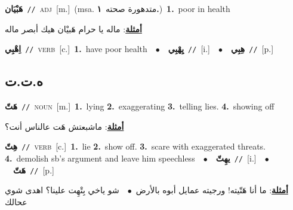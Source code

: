 \documentclass[10pt,a4paper,twoside]{article} %
\begin{document}
\begin{multicols}{2}
{{{{{{{{{{\setlength\topsep{0pt}\textbf{\foreignlanguage{arabic}{هَبْيَان}}\ {\color{gray}\texttt{//}\color{black}}\ \textsc{adj}\ [m.]\ \color{gray}(msa. \foreignlanguage{arabic}{متدهورة صحته}~\foreignlanguage{arabic}{\textbf{١.}})\color{black}\ \textbf{1.}~poor in health\  \begin{flushright}\color{gray}\foreignlanguage{arabic}{\textbf{\underline{\foreignlanguage{arabic}{أمثلة}}}: ماله يا حرام هَبيْان هيك أبصر ماله}\end{flushright}\color{black}} \vspace{2mm}

{\setlength\topsep{0pt}\textbf{\foreignlanguage{arabic}{اِهْبِي}}\ {\color{gray}\texttt{//}\color{black}}\ \textsc{verb}\ [c.]\ \textbf{1.}~have poor health\ \ $\bullet$\ \ \setlength\topsep{0pt}\textbf{\foreignlanguage{arabic}{يِهْبِي}}\ {\color{gray}\texttt{//}\color{black}}\ [i.]\ \ $\bullet$\ \ \setlength\topsep{0pt}\textbf{\foreignlanguage{arabic}{هِبِي}}\ {\color{gray}\texttt{//}\color{black}}\ [p.]\ 

\vspace{-3mm}
\subsection*{\color{blue}\foreignlanguage{arabic}{ه.ت.ت}\color{blue}{}} 

{\setlength\topsep{0pt}\textbf{\foreignlanguage{arabic}{هَتّ}}\ {\color{gray}\texttt{//}\color{black}}\ \textsc{noun}\ [m.]\ \textbf{1.}~lying  \textbf{2.}~exaggerating  \textbf{3.}~telling lies.  \textbf{4.}~showing off\  \begin{flushright}\color{gray}\foreignlanguage{arabic}{\textbf{\underline{\foreignlanguage{arabic}{أمثلة}}}: ماشبعتش هَت عالناس أنت؟}\end{flushright}\color{black}} \vspace{2mm}

{\setlength\topsep{0pt}\textbf{\foreignlanguage{arabic}{هِتّ}}\ {\color{gray}\texttt{//}\color{black}}\ \textsc{verb}\ [c.]\ \textbf{1.}~lie  \textbf{2.}~show off.  \textbf{3.}~scare with exaggerated threats.  \textbf{4.}~demolish sb's argument and leave him speechless\ \ $\bullet$\ \ \setlength\topsep{0pt}\textbf{\foreignlanguage{arabic}{يهِتّ}}\ {\color{gray}\texttt{//}\color{black}}\ [i.]\ \ $\bullet$\ \ \setlength\topsep{0pt}\textbf{\foreignlanguage{arabic}{هَتّ}}\ {\color{gray}\texttt{//}\color{black}}\ [p.]\  \begin{flushright}\color{gray}\foreignlanguage{arabic}{\textbf{\underline{\foreignlanguage{arabic}{أمثلة}}}: ما أنا هَتّيته! ورجيته عمايل أبوه بالأرض\ $\bullet$\ \  شو ياخي بِتْهِت علينا؟ اهدى شوي عحالك}\end{flushright}\color{black}} \vspace{2mm}

}}}}}}}}}}
\end{multicols}
\end{document}
